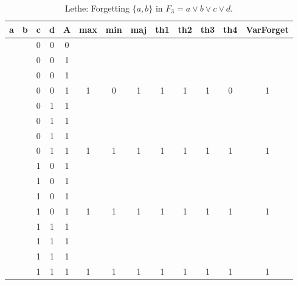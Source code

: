 \begin{table}[!tb]
    \centering
    \begin{tabular}{|c|c|c|c|c|c|c|c|c|c|c|c|c|}
        \hline
        \textbf{a} & \textbf{b} & \textbf{c} & \textbf{d} & \textbf{A} & \textbf{max} & \textbf{min} & \textbf{maj} & \textbf{th1} & \textbf{th2} & \textbf{th3} & \textbf{th4} & \textbf{VarForget} \\ \hline
        \rowcolor{gray!40}  &  & 0 & 0 & 0 &  &  &  &  &  &  &  &  \\ \hline
        \rowcolor{gray!40}  &  & 0 & 0 & 1 &  &  &  &  &  &  &  &  \\ \hline
        \rowcolor{gray!40}  &  & 0 & 0 & 1 &  &  &  &  &  &  &  &  \\ \hline
        \rowcolor{gray!40}  &  & 0 & 0 & 1 & 1 & 0 & 1 & 1 & 1 & 1 & 0 & 1 \\ \hline
        \rowcolor{blue!40}  &  & 0 & 1 & 1 &  &  &  &  &  &  &  &  \\ \hline
        \rowcolor{blue!40}  &  & 0 & 1 & 1 &  &  &  &  &  &  &  &  \\ \hline
        \rowcolor{blue!40}  &  & 0 & 1 & 1 &  &  &  &  &  &  &  &  \\ \hline
        \rowcolor{blue!40}  &  & 0 & 1 & 1 & 1 & 1 & 1 & 1 & 1 & 1 & 1 & 1 \\ \hline
        \rowcolor{red!40}  &  & 1 & 0 & 1 &  &  &  &  &  &  &  &  \\ \hline
        \rowcolor{red!40}  &  & 1 & 0 & 1 &  &  &  &  &  &  &  &  \\ \hline
        \rowcolor{red!40}  &  & 1 & 0 & 1 &  &  &  &  &  &  &  &  \\ \hline
        \rowcolor{red!40}  &  & 1 & 0 & 1 & 1 & 1 & 1 & 1 & 1 & 1 & 1 & 1 \\ \hline
        \rowcolor{green!40}  &  & 1 & 1 & 1 &  &  &  &  &  &  &  &  \\ \hline
        \rowcolor{green!40}  &  & 1 & 1 & 1 &  &  &  &  &  &  &  &  \\ \hline
        \rowcolor{green!40}  &  & 1 & 1 & 1 &  &  &  &  &  &  &  &  \\ \hline
        \rowcolor{green!40}  &  & 1 & 1 & 1 & 1 & 1 & 1 & 1 & 1 & 1 & 1 & 1 \\ \hline
    \end{tabular}
    \caption{Lethe: Forgetting $\{a, b\}$ in $F_{3} = a \lor b \lor c \lor d$.}
    \label{tab:lethe-F3-ab}
\end{table}
